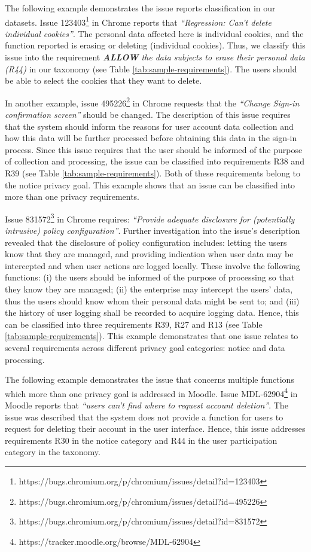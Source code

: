 The following example demonstrates the issue reports classification in our datasets. Issue 123403\footnote{https://bugs.chromium.org/p/chromium/issues/detail?id=123403} in Chrome reports that \textit{``Regression: Can't delete individual cookies''}. The personal data affected here is individual cookies, and the function reported is erasing or deleting (individual cookies). Thus, we classify this issue into the requirement \textit{\textbf{ALLOW} the data subjects to erase their personal data (R44)} in our taxonomy (see Table \ref{tab:sample-requirements}). The users should be able to select the cookies that they want to delete.

In another example, issue 495226\footnote{https://bugs.chromium.org/p/chromium/issues/detail?id=495226} in Chrome requests that the \textit{``Change Sign-in confirmation screen''} should be changed. The description of this issue requires that the system should inform the reasons for user account data collection and how this data will be further processed before obtaining this data in the sign-in process. Since this issue requires that the user should be informed of the purpose of collection and processing, the issue can be classified into requirements R38 and R39 (see Table \ref{tab:sample-requirements}). Both of these requirements belong to the notice privacy goal. This example shows that an issue can be classified into more than one privacy requirements.

Issue 831572\footnote{https://bugs.chromium.org/p/chromium/issues/detail?id=831572} in Chrome requires: \textit{``Provide adequate disclosure for (potentially intrusive) policy configuration''}. Further investigation into the issue's description revealed that the disclosure of policy configuration includes: letting the users know that they are managed, and providing indication when user data may be intercepted and when user actions are logged locally. These involve the following functions: (i) the users should be informed of the purpose of processing so that they know they are managed; (ii) the enterprise may intercept the users' data, thus the users should know whom their personal data might be sent to; and (iii) the history of user logging shall be recorded to acquire logging data. Hence, this can be classified into three requirements R39, R27 and R13 (see Table \ref{tab:sample-requirements}). This example demonstrates that one issue relates to several requirements across different privacy goal categories: notice and data processing.

The following example demonstrates the issue that concerns multiple functions which more than one privacy goal is addressed in Moodle. Issue MDL-62904\footnote{https://tracker.moodle.org/browse/MDL-62904} in Moodle reports that \textit{``users can't find where to request account deletion''}. The issue was described that the system does not provide a function for users to request for deleting their account in the user interface. Hence, this issue addresses requirements R30 in the notice category and R44 in the user participation category in the taxonomy.

